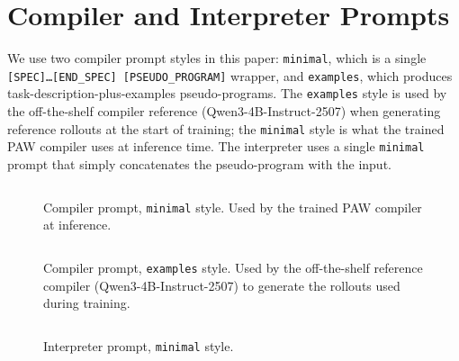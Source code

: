 \section{Compiler and Interpreter Prompts}
\label{appendix:paw_prompts}

We use two compiler prompt styles in this paper: \texttt{minimal}, which is a single \texttt{[SPEC]\ldots[END\_SPEC]\ [PSEUDO\_PROGRAM]} wrapper, and \texttt{examples}, which produces task-description-plus-examples pseudo-programs. The \texttt{examples} style is used by the off-the-shelf compiler reference (Qwen3-4B-Instruct-2507) when generating reference rollouts at the start of training; the \texttt{minimal} style is what the trained PAW compiler uses at inference time. The interpreter uses a single \texttt{minimal} prompt that simply concatenates the pseudo-program with the input.

\begin{figure}[!h]
    \centering
   \begin{tcolorbox}[colframe=borderblue, colback=bggray, left=1mm, right=1mm, top=0.5mm, bottom=0.5mm]
\inputminted[fontsize=\scriptsize, breaklines, breakanywhere, breaksymbolleft={}]{markdown}{figures/prompts/prompt_paw_compiler_minimal.md}
\end{tcolorbox}
     \caption{\label{fig:prompt_paw_compiler_minimal}Compiler prompt, \texttt{minimal} style. Used by the trained PAW compiler at inference.}
\end{figure}

\begin{figure}[!h]
    \centering
   \begin{tcolorbox}[colframe=borderblue, colback=bggray, left=1mm, right=1mm, top=0.5mm, bottom=0.5mm]
\inputminted[fontsize=\scriptsize, breaklines, breakanywhere, breaksymbolleft={}]{markdown}{figures/prompts/prompt_paw_compiler_examples.md}
\end{tcolorbox}
     \caption{\label{fig:prompt_paw_compiler_examples}Compiler prompt, \texttt{examples} style. Used by the off-the-shelf reference compiler (Qwen3-4B-Instruct-2507) to generate the rollouts used during training.}
\end{figure}

\begin{figure}[!h]
    \centering
   \begin{tcolorbox}[colframe=borderblue, colback=bggray, left=1mm, right=1mm, top=0.5mm, bottom=0.5mm]
\inputminted[fontsize=\scriptsize, breaklines, breakanywhere, breaksymbolleft={}]{markdown}{figures/prompts/prompt_paw_interpreter_minimal.md}
\end{tcolorbox}
     \caption{\label{fig:prompt_paw_interpreter_minimal}Interpreter prompt, \texttt{minimal} style.}
\end{figure}



